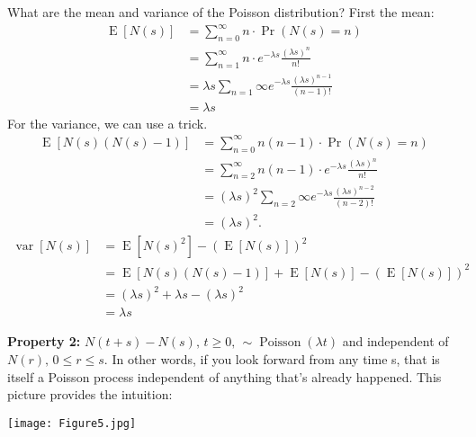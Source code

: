 \documentclass[11pt]{article}
\DeclareMathOperator{\E}{E}
\DeclareMathOperator{\var}{var}
\DeclareMathOperator{\Poisson}{Poisson}
\newenvironment{propertybox}{%
   \def\FrameCommand{\colorbox{LightSteelBlue}}%
   \MakeFramed{\advance\hsize-\width \FrameRestore}}
 {\endMakeFramed}
\begin{document}
What are the mean and variance of the Poisson distribution? First the mean:
\begin{equation}
\begin{split}
\E\left[ N(s)\right] &= \sum_{n=0}^{\infty} n \cdot \Pr\left(N(s) = n\right) \\
  &= \sum_{n=1}^{\infty} n \cdot e^{-\lambda s} \frac{(\lambda s)^n}{n!} \\
  &= \lambda s \sum_{n=1}{\infty} e^{-\lambda s} \frac{ (\lambda s)^{n-1} }{(n-1)!} \\
  &= \boxed{\lambda s}
\end{split}
\end{equation}
For the variance, we can use a trick.
\begin{equation}
\begin{split}
\E\left[ N(s) \left(N(s) - 1\right)\right] &= \sum_{n=0}^{\infty} n (n-1) \cdot \Pr\left(N(s) = n\right) \\
  &= \sum_{n=2}^{\infty} n (n - 1) \cdot e^{-\lambda s} \frac{(\lambda s)^n}{n!} \\
  &= (\lambda s)^2 \sum_{n=2}{\infty} e^{-\lambda s} \frac{ (\lambda s)^{n-2} }{(n-2)!} \\
  &= (\lambda s)^2.
\end{split}
\end{equation}
\begin{equation}
\begin{split}
\var\left[ N(s) \right] &= \E\left[N(s)^2\right] - \left(\E\left[N(s)\right]\right)^2 \\
  &= \E\left[ N(s) \left( N(s) - 1\right)\right] + \E\left[ N(s) \right] - \left(\E\left[N(s)\right]\right)^2 \\
  &= (\lambda s)^2 + \lambda s - (\lambda s)^2 \\
  &= \boxed{\lambda s}
\end{split}
\end{equation}

\begin{propertybox}
{\bf Property 2:}
$N(t+s) - N(s), \, t\geq 0, \, \sim \Poisson(\lambda t)$ and independent of $N(r), \, 0\leq r \leq s$.
\end{propertybox}
In other words, if you look forward from any time s, that is itself a Poisson process independent of anything that's already
happened. This picture provides the intuition:

\begin{center}
\texttt{[image: Figure5.jpg]}
\end{center}
\end{document}
